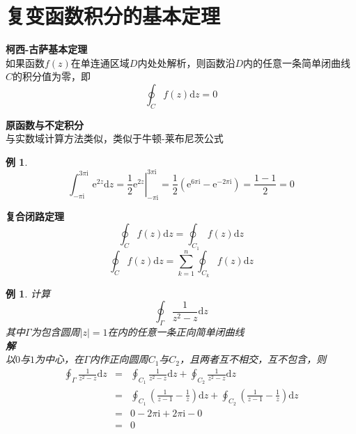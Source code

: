 \documentclass[12pt, a4paper, twoside]{ctexbook}
\newtheorem{example}[theorem]{例}
\begin{document}
\section{复变函数积分的基本定理}
\textbf{柯西-古萨基本定理}\\
如果函数$f\left(z\right)$在单连通区域$D$内处处解析，则函数沿$D$内的任意一条简单闭曲线$C$的积分值为零，即
$$
\oint_C f\left(z\right)\mathrm{d}z=0
$$

\textbf{原函数与不定积分}\\
与实数域计算方法类似，类似于牛顿-莱布尼茨公式
\begin{example}
	$$
	\int_{-\pi\mathrm{i}}^{3\pi\mathrm{i}}{\mathrm{e}^{2z}}\mathrm{d}z=\left. \frac{1}{2}\mathrm{e}^{2z} \right|_{-\pi \mathrm{i}}^{3\pi \mathrm{i}}=\frac{1}{2}\left( \mathrm{e}^{6\pi\mathrm{i}}-\mathrm{e}^{-2\pi\mathrm{i}}\right)=\frac{1-1}{2}=0
	$$
\end{example}

\textbf{复合闭路定理}
$$
\oint_C{f\left( z \right) \text{d}z}=\oint_{C_1}{f\left( z \right) \text{d}z}
$$
$$
\oint_C{f\left( z \right) \text{d}z}=\sum_{k=1}^n{\oint_{C_k}{f\left( z \right) \text{d}z}}
$$

\begin{example}
	计算
	$$
	\oint_{\Gamma}{\frac{1}{z^2-z}\mathrm{d}z}
	$$
	\hspace*{2em}其中$\Gamma$为包含圆周$\left|z\right|=1$在内的任意一条正向简单闭曲线\\
	\hspace*{1em}\textbf{解}\\
	\hspace*{2em}以$0$与$1$为中心，在$\Gamma$内作正向圆周$C_1$与$C_2$，且两者互不相交，互不包含，则
	\begin{eqnarray}
        \oint_{\Gamma}{\frac{1}{z^2-z}\mathrm{d}z}&=&\oint_{C_1}{\frac{1}{z^2-z}\mathrm{d}z}+\oint_{C_2}{\frac{1}{z^2-z}\mathrm{d}z} \nonumber      \\
        ~&=&\oint_{C_1}{\left(\frac{1}{z-1}-\frac{1}{z}\right)\mathrm{d}z}+\oint_{C_2}{\left(\frac{1}{z-1}-\frac{1}{z}\right)\mathrm{d}z} \nonumber    \\
        ~&=&0-2\pi\mathrm{i}+2\pi\mathrm{i}-0 \nonumber	  \\
		~&=&0 \nonumber
    \end{eqnarray}
\end{example}
\end{document}
